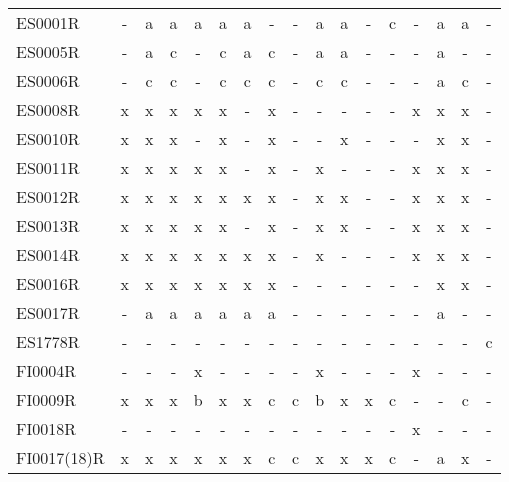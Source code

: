 \begin{table}
{{\begin{tabular}{l|cccccccccccccccc}
        ES0001R &  - &   a &    a &      a &   a &    a &    - &    - &      a &    a &    - &   c &      - &    a &    a &     - \\
        ES0005R &  - &   a &    c &      - &   c &    a &    c &    - &      a &    a &    - &   - &      - &    a &    - &     - \\
        ES0006R &  - &   c &    c &      - &   c &    c &    c &    - &      c &    c &    - &   - &      - &    a &    c &     - \\
        ES0008R &  x &   x &    x &      x &   x &    - &    x &    - &      - &    - &    - &   - &      x &    x &    x &     - \\
        ES0010R &  x &   x &    x &      - &   x &    - &    x &    - &      - &    x &    - &   - &      - &    x &    x &     - \\
        ES0011R &  x &   x &    x &      x &   x &    - &    x &    - &      x &    - &    - &   - &      x &    x &    x &     - \\
        ES0012R &  x &   x &    x &      x &   x &    x &    x &    - &      x &    x &    - &   - &      x &    x &    x &     - \\
        ES0013R &  x &   x &    x &      x &   x &    - &    x &    - &      x &    x &    - &   - &      x &    x &    x &     - \\
        ES0014R &  x &   x &    x &      x &   x &    x &    x &    - &      x &    - &    - &   - &      x &    x &    x &     - \\
        ES0016R &  x &   x &    x &      x &   x &    x &    x &    - &      - &    - &    - &   - &      - &    x &    x &     - \\
        ES0017R &  - &   a &    a &      a &   a &    a &    a &    - &      - &    - &    - &   - &      - &    a &    - &     - \\
        ES1778R &  - &   - &    - &      - &   - &    - &    - &    - &      - &    - &    - &   - &      - &    - &    - &     c \\
        FI0004R &  - &   - &    - &      x &   - &    - &    - &    - &      x &    - &    - &   - &      x &    - &    - &     - \\
        FI0009R &  x &   x &    x &      b &   x &    x &    c &    c &      b &    x &    x &   c &      - &    - &    c &     - \\
        FI0018R &  - &   - &    - &      - &   - &    - &    - &    - &      - &    - &    - &   - &      x &    - &    - &     - \\
FI0017(18)R &  x &   x &    x &      x &   x &    x &    c &    c &      x &    x &    x &   c &      - &    a &    x &     - \\

\end{tabular}}}
\end{table}
